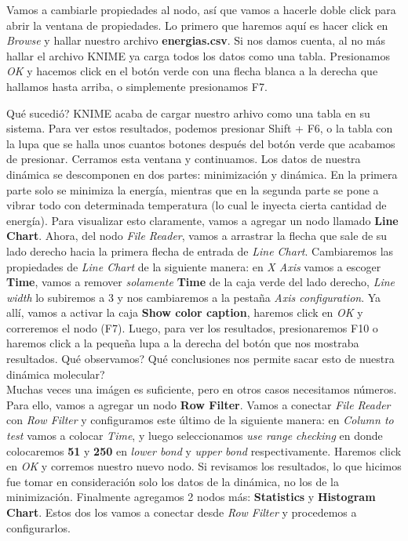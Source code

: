 \documentclass[10pt,letterpaper]{article}
\begin{document}
Vamos a cambiarle propiedades al nodo, as\'i que vamos a hacerle doble click para abrir la ventana de propiedades. Lo primero que haremos aqu\'i es hacer click en \textit{Browse} y hallar nuestro archivo \textbf{energias.csv}. Si nos damos cuenta, al no m\'as hallar el archivo KNIME ya carga todos los datos como una tabla. Presionamos \textit{OK} y hacemos click en el bot\'on verde con una flecha blanca a la derecha que hallamos hasta arriba, o simplemente presionamos F7.

Qu\'e sucedi\'o? KNIME acaba de cargar nuestro arhivo como una tabla en su sistema. Para ver estos resultados, podemos presionar Shift + F6, o la tabla con la lupa que se halla unos cuantos botones despu\'es del bot\'on verde que acabamos de presionar. Cerramos esta ventana y continuamos. Los datos de nuestra din\'amica se descomponen en dos partes: minimizaci\'on y din\'amica. En la primera parte solo se minimiza la energ\'ia, mientras que en la segunda parte se pone a vibrar todo con determinada temperatura (lo cual le inyecta cierta cantidad de energ\'ia). Para visualizar esto claramente, vamos a agregar un nodo llamado \textbf{Line Chart}. Ahora, del nodo \emph{File Reader}, vamos a arrastrar la flecha que sale de su lado derecho hacia la primera flecha de entrada de \emph{Line Chart}. Cambiaremos las propiedades de \emph{Line Chart} de la siguiente manera: en \textit{X Axis} vamos a escoger \textbf{Time}, vamos a remover \emph{solamente} \textbf{Time} de la caja verde del lado derecho, \textit{Line width} lo subiremos a 3 y nos cambiaremos a la pesta\~na \textit{Axis configuration}. Ya all\'i, vamos a activar la caja \textbf{Show color caption}, haremos click en \textit{OK} y correremos el nodo (F7). Luego, para ver los resultados, presionaremos F10 o haremos click a la peque\~na lupa a la derecha del bot\'on que nos mostraba resultados. Qu\'e observamos? Qu\'e conclusiones nos permite sacar esto de nuestra din\'amica molecular?\\

Muchas veces una im\'agen es suficiente, pero en otros casos necesitamos n\'umeros. Para ello, vamos a agregar un nodo \textbf{Row Filter}. Vamos a conectar \textit{File Reader} con \textit{Row Filter} y configuramos este \'ultimo de la siguiente manera: en \textit{Column to test} vamos a colocar \textit{Time}, y luego seleccionamos \textit{use range checking} en donde colocaremos \textbf{51} y \textbf{250} en \textit{lower bond} y \textit{upper bond} respectivamente. Haremos click en \textit{OK} y corremos nuestro nuevo nodo. Si revisamos los resultados, lo que hicimos fue tomar en consideraci\'on solo los datos de la din\'amica, no los de la minimizaci\'on. Finalmente agregamos 2 nodos m\'as: \textbf{Statistics} y \textbf{Histogram Chart}. Estos dos los vamos a conectar desde \textit{Row Filter} y procedemos a configurarlos.\\
\end{document}
